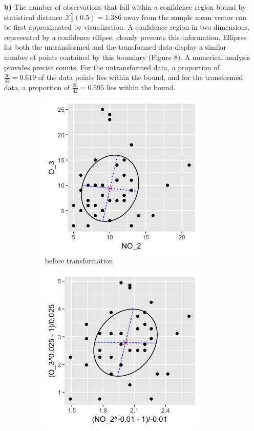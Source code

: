 \begin{enumerate}
	\item[\bf{b)}] The number of observations that fall within a confidence region bound by statistical distance $\mathcal{X}_2^2(0.5)=1.386$ away from the sample mean vector can be first approximated by visualization. A confidence region in two dimensions, represented by a confidence ellipse, cleanly presents this information. Ellipses for both the untransformed and the transformed data display a similar number of points contained by this boundary (Figure 8). A numerical analysis provides precise counts. For the untransformed data, a proportion of $\frac{26}{42}=0.619$ of the data points lies within the bound, and for the transformed data, a proportion of $\frac{25}{42} = 0.595$ lies within the bound.
\begin{figure}[H]
\begin{subfigure}{.5\textwidth}
  \centering
  \includegraphics[width=.8\linewidth]{plot_4_29_b_ellipse.png}
  \caption{before transformation}
  \label{fig:sfig1}
\end{subfigure}%
\begin{subfigure}{.5\textwidth}
  \centering
	\includegraphics[width=.8\linewidth]{plot_4_29_b_ellipsenew.png}

\end{subfigure}
\end{figure}
\end{enumerate}
